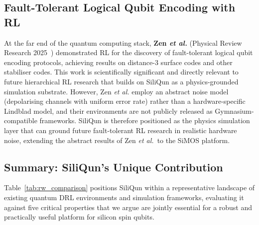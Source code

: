 \subsection{Fault-Tolerant Logical Qubit Encoding with RL}
\label{sec:rw_fault_tolerant}

At the far end of the quantum computing stack, \textbf{Zen \emph{et al.}}
(Physical Review Research 2025~\cite{Zen2025}) demonstrated RL for the discovery of
fault-tolerant logical qubit encoding protocols, achieving results on
distance-3 surface codes and other stabiliser codes. This work is
scientifically significant and directly relevant to future hierarchical RL
research that builds on SiliQun as a physics-grounded simulation substrate.
However, Zen \emph{et al.}
employ an abstract noise model (depolarising channels with uniform error
rate) rather than a hardware-specific Lindblad model, and their
environments are not publicly released as Gymnasium-compatible frameworks.
SiliQun is therefore positioned as the physics simulation layer that can
ground future fault-tolerant RL research in realistic hardware noise,
extending the abstract results of Zen \emph{et al.}\ to the SiMOS platform.

\subsection{Summary: SiliQun's Unique Contribution}
\label{sec:rw_summary}

Table~\ref{tab:rw_comparison} positions SiliQun within a representative
landscape of existing quantum DRL environments and simulation frameworks,
evaluating it against five critical properties that we argue are jointly
essential for a robust and practically useful platform for silicon spin
qubits.

